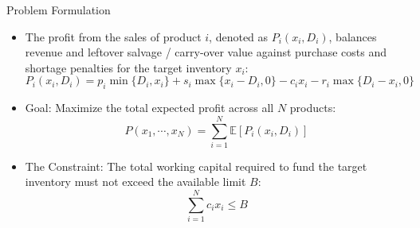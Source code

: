 \documentclass[11pt]{beamer}
\begin{document}
\begin{frame}{Problem Formulation}
\begin{itemize}
\item The profit from the sales of product $i$, denoted as $P_i(x_i, D_i)$, balances revenue and leftover salvage / carry-over value against purchase costs and shortage penalties for the target inventory $x_i$:
\begin{equation*}
P_i(x_i, D_i) = p_i \min\{D_i, x_i\} + s_i \max\{x_i - D_i, 0\} - c_i x_i - r_i \max\{D_i-x_i, 0\}
\end{equation*}
\item Goal: Maximize the total expected profit across all $N$ products:
\begin{equation*}
P(x_1, \cdots, x_N) = \sum_{i=1}^N \mathbb{E}[P_i(x_i, D_i)]
\end{equation*}
\item The Constraint: The total working capital required to fund the target inventory must not exceed the available limit $B$:
\begin{equation*}
\sum_{i=1}^N c_i x_i \leq B
\end{equation*}
\end{itemize}
\end{frame}
\end{document}
